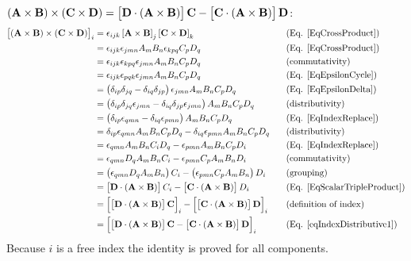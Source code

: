  
$\left(\mathbf{ A}\times\mathbf{ B}\right)\times\left(\mathbf{ C}\times\mathbf{ D}
\right)=\left[\mathbf{ D}\cdot\left(\mathbf{ A}\times\mathbf{ B}\right)\right]
\mathbf{ C}-\left[\mathbf{ C}\cdot\left(\mathbf{ A}\times\mathbf{ B}\right)\right]
\mathbf{ D}$:
\begin{equation}
\begin{aligned}\left[\left(\mathbf{ A}\times\mathbf{ B}\right)\times\left(\mathbf{ 
C}\times\mathbf{ D}\right)\right]_{i} & 
=\epsilon_{ijk}\left[\mathbf{ A}\times\mathbf{ B}\right]_{j}\left[\mathbf{ C}
\times\mathbf{ D}\right]_{k} & \,\,\,\,\, & \text{(Eq. \ref{EqCrossProduct})}\\
 & =\epsilon_{ijk}\epsilon_{jmn}A_{m}B_{n}\epsilon_{kpq}C_{p}D_{q} &  & 
\text{(Eq. \ref{EqCrossProduct})}\\
 & =\epsilon_{ijk}\epsilon_{kpq}\epsilon_{jmn}A_{m}B_{n}C_{p}D_{q} &  & 
\text{(commutativity)}\\
 & =\epsilon_{ijk}\epsilon_{pqk}\epsilon_{jmn}A_{m}B_{n}C_{p}D_{q} &  & 
\text{(Eq. \ref{EqEpsilonCycle})}\\
 & 
=\left(\delta_{ip}\delta_{jq}-\delta_{iq}\delta_{jp}\right)\epsilon_{jmn}A_{m}B_
{n}C_{p}D_{q} &  & \text{(Eq. \ref{EqEpsilonDelta})}\\
 & 
=\left(\delta_{ip}\delta_{jq}\epsilon_{jmn}-\delta_{iq}\delta_{jp}\epsilon_{jmn}
\right)A_{m}B_{n}C_{p}D_{q} &  & \text{(distributivity)}\\
 & 
=\left(\delta_{ip}\epsilon_{qmn}-\delta_{iq}\epsilon_{pmn}\right)A_{m}B_{n}C_{p}
D_{q} &  & \text{(Eq. \ref{EqIndexReplace})}\\
 & 
=\delta_{ip}\epsilon_{qmn}A_{m}B_{n}C_{p}D_{q}-\delta_{iq}\epsilon_{pmn}A_{m}B_{
n}C_{p}D_{q} &  & \text{(distributivity)}\\
 & =\epsilon_{qmn}A_{m}B_{n}C_{i}D_{q}-\epsilon_{pmn}A_{m}B_{n}C_{p}D_{i} &  & 
\text{(Eq. \ref{EqIndexReplace})}\\
 & =\epsilon_{qmn}D_{q}A_{m}B_{n}C_{i}-\epsilon_{pmn}C_{p}A_{m}B_{n}D_{i} &  & 
\text{(commutativity)}\\
 & 
=\left(\epsilon_{qmn}D_{q}A_{m}B_{n}\right)C_{i}-\left(\epsilon_{pmn}C_{p}A_{m}
B_{n}\right)D_{i} &  & \text{(grouping)}\\
 & 
=\left[\mathbf{ D}\cdot\left(\mathbf{ A}\times\mathbf{ B}\right)\right]C_{i}-\left[
\mathbf{ C}\cdot\left(\mathbf{ A}\times\mathbf{ B}\right)\right]D_{i} &  & 
\text{(Eq. \ref{EqScalarTripleProduct})}\\
 & 
=\left[\left[\mathbf{ D}\cdot\left(\mathbf{ A}\times\mathbf{ B}\right)\right]
\mathbf{ C}\right]_{i}-\left[\left[\mathbf{ C}\cdot\left(\mathbf{ A}\times\mathbf{ B
}\right)\right]\mathbf{ D}\right]_{i} &  & \text{(definition of index)}\\
 & 
=\left[\left[\mathbf{ D}\cdot\left(\mathbf{ A}\times\mathbf{ B}\right)\right]
\mathbf{ C}-\left[\mathbf{ C}\cdot\left(\mathbf{ A}\times\mathbf{ B}\right)\right]
\mathbf{ D}\right]_{i} &  & \text{(Eq. \ref{eqIndexDistributive1})}
\end{aligned}
\end{equation}
Because $i$ is a free index the identity is proved for all components.


